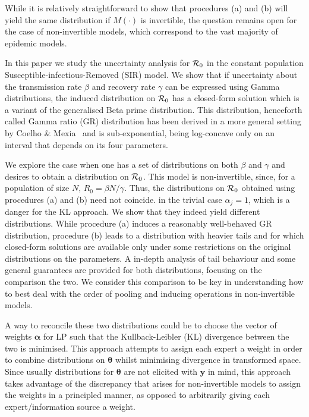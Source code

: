 \documentclass[11pt]{article}
\begin{document}
While it is relatively straightforward to show that procedures (a) and (b) will yield the same distribution if $M(\cdot)$ is invertible, the question remains open for the case of non-invertible models, which correspond to the vast majority of epidemic models.

In this paper we study the uncertainty analysis for ${\cal R}_0$ in the constant 
population 	Susceptible-infectious-Removed (SIR) model.
We show that if uncertainty about the transmission rate $\beta$ and recovery 
rate $\gamma$ can be expressed using Gamma distributions, the induced 
distribution on ${\cal R}_0$ has a closed-form solution which is a variant of 
the generalised Beta prime distribution.
This distribution, henceforth called Gamma ratio (GR) distribution has been 
derived in a more general setting by Coelho \& Mexia~\cite{Coelho2007} and is 
sub-exponential, being log-concave only on an interval that depends on its four 
parameters.%

We explore the case when one has a set of distributions on both $\beta$ and 
$\gamma$ and desires to obtain a distribution on ${\cal R}_0$.
This model is non-invertible, since, for a population of size $N$,  $R_0 = \beta 
N/\gamma$.
Thus, the distributions on ${\cal R}_0$ obtained using procedures (a) and (b) 
need not coincide. %
in the trivial case $\alpha_j = 1$, which is a danger for the KL approach.
We show that they indeed yield different distributions.
While procedure (a) induces a reasonably well-behaved GR distribution, procedure 
(b) leads to a distribution with heavier tails and for which closed-form 
solutions are available only under some restrictions on the original 
distributions on the parameters.
A in-depth analysis of tail behaviour and some general guarantees are provided 
for both distributions, focusing on the comparison the two.
We consider this comparison to be key in understanding how to best deal with the 
order of pooling and inducing operations in non-invertible models.

A way to reconcile these two distributions could be to choose the vector of 
weights $\boldsymbol\alpha$ for LP such that the Kullback-Leibler (KL) 
divergence between the two is minimised.
This approach attempts to assign each expert a weight in order to combine 
distributions on $\boldsymbol\theta$ whilst minimising divergence in transformed 
space.
Since usually distributions for $\boldsymbol\theta$ are not elicited with 
$\mathbf{y}$ in mind, this approach takes advantage of the discrepancy that 
arises for non-invertible models to assign the weights in a principled manner, 
as opposed to arbitrarily giving each expert/information source a weight.
\end{document}
